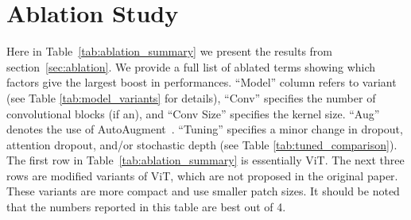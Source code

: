 \documentclass[10pt,twocolumn,letterpaper]{article}
\begin{document}
\section{Ablation Study}
\label{appdx:ablation}
Here in Table~\ref{tab:ablation_summary} we present the results from section~\ref{sec:ablation}.
We provide a full list of ablated terms showing which factors give the largest boost in performances.
``Model'' column refers to variant (see Table \ref{tab:model_variants} for details), ``Conv'' specifies the number of convolutional blocks (if an), and ``Conv Size'' specifies the kernel size.
``Aug'' denotes the use of AutoAugment~\cite{cubuk2019autoaugment}.
``Tuning'' specifies a minor change in dropout, attention dropout, and/or stochastic depth (see Table \ref{tab:tuned_comparison}).
The first row in Table~\ref{tab:ablation_summary} is essentially ViT.
The next three rows are modified variants of ViT, which are not proposed in the original paper. These variants are more compact and use smaller patch sizes.
It should be noted that the numbers reported in this table are best out of 4.
\end{document}
